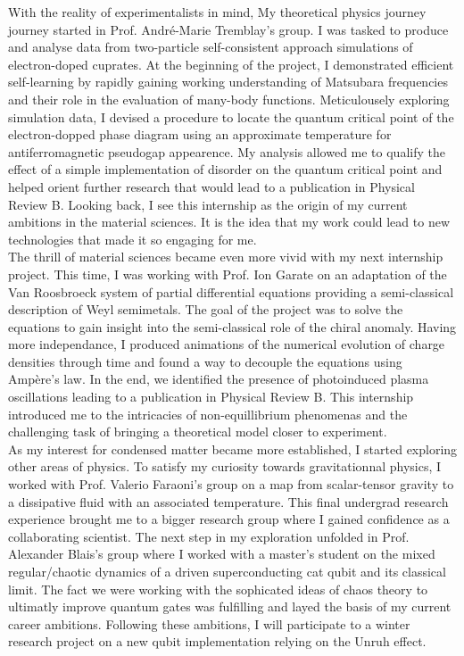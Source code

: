 \documentclass[12pt]{article}
\begin{document}
With the reality of experimentalists in mind, My theoretical physics journey journey started in Prof. André-Marie Tremblay's group. I was tasked to produce and analyse data from two-particle self-consistent approach simulations of electron-doped cuprates. At the beginning of the project, I demonstrated efficient self-learning by rapidly gaining working understanding of Matsubara frequencies and their role in the evaluation of many-body functions. Meticulousely exploring simulation data, I devised a procedure to locate the quantum critical point of the electron-dopped phase diagram using an approximate temperature for antiferromagnetic pseudogap appearence. My analysis allowed me to qualify the effect of a simple implementation of disorder on the quantum critical point and helped orient further research that would lead to a publication in Physical Review B. Looking back, I see this internship as the origin of my current ambitions in the material sciences. It is the idea that my work could lead to new technologies that made it so engaging for me.\\ 

The thrill of material sciences became even more vivid with my next internship project. This time, I was working with Prof. Ion Garate on an adaptation of the Van Roosbroeck system of partial differential equations providing a semi-classical description of Weyl semimetals. The goal of the project was to solve the equations to gain insight into the semi-classical role of the chiral anomaly. Having more independance, I produced animations of the numerical evolution of charge densities through time and found a way to decouple the equations using Ampère's law. In the end, we identified the presence of photoinduced plasma oscillations leading to a publication in Physical Review B. This internship introduced me to the intricacies of non-equillibrium phenomenas and the challenging task of bringing a theoretical model closer to experiment.\\ 

As my interest for condensed matter became more established, I started exploring other areas of physics. To satisfy my curiosity towards gravitationnal physics, I worked with Prof. Valerio Faraoni's group on a map from scalar-tensor gravity to a dissipative fluid with an associated temperature. This final undergrad research experience brought me to a bigger research group where I gained confidence as a collaborating scientist. The next step in my exploration unfolded in Prof. Alexander Blais's group where I worked with a master's student on the mixed regular/chaotic dynamics of a driven superconducting cat qubit and its classical limit. The fact we were working with the sophicated ideas of chaos theory to ultimatly improve quantum gates was fulfilling and layed the basis of my current career ambitions. Following these ambitions, I will participate to a winter research project on a new qubit implementation relying on the Unruh effect.\\ 
\end{document}
